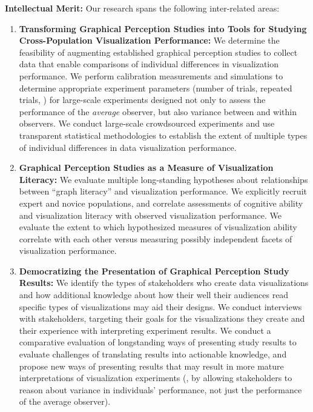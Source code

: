 \documentclass[11pt]{article}
\begin{document}
\noindent\textbf{Intellectual Merit:} Our research spans the following inter-related areas:
\vspace{-0.75em}
\begin{enumerate}[noitemsep]
  \item \textbf{Transforming Graphical Perception Studies into Tools for Studying Cross-Population Visualization Performance:} We determine the feasibility of augmenting established graphical perception studies to collect data that enable comparisons of individual differences in visualization performance. We perform calibration measurements and simulations to determine appropriate experiment parameters (\eg number of trials, repeated trials, \etc) for large-scale experiments designed not only to assess the performance of the \emph{average} observer, but also variance between and within observers. We conduct large-scale crowdsourced experiments and use transparent statistical methodologies to establish the extent of multiple types of individual differences in data visualization performance.
  \item \textbf{Graphical Perception Studies as a Measure of Visualization Literacy:} We evaluate multiple long-standing hypotheses about relationships between ``graph literacy'' and visualization performance. We explicitly recruit expert and novice populations, and correlate assessments of cognitive ability and visualization literacy with observed visualization performance. We evaluate the extent to which hypothesized measures of visualization ability correlate with each other versus measuring possibly independent facets of visualization performance.
  \item \textbf{Democratizing the Presentation of Graphical Perception Study Results:} We identify the types of stakeholders who create data visualizations and how additional knowledge about how their well their audiences read specific types of visualizations may aid their designs. We conduct interviews with stakeholders, targeting their goals for the visualizations they create and their experience with interpreting experiment results. We conduct a comparative evaluation of longstanding ways of presenting study results to evaluate challenges of translating results into actionable knowledge, and propose new ways of presenting results that may result in more mature interpretations of visualization experiments (\eg, by allowing stakeholders to reason about variance in individuals' performance, not just the performance of the average observer).
\end{enumerate}
\end{document}
